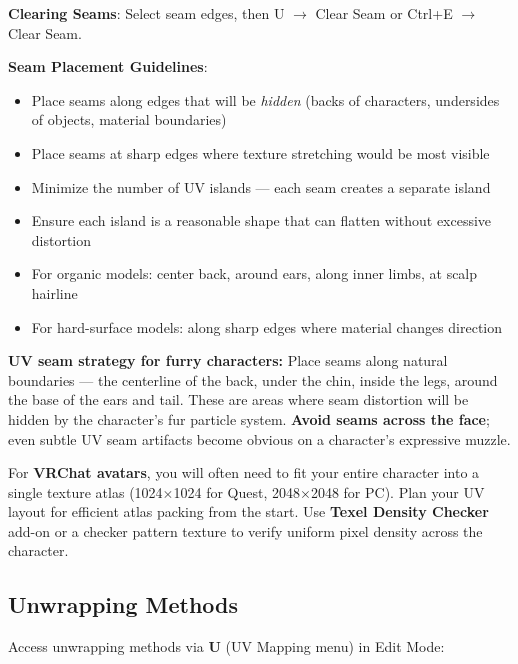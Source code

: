 \textbf{Clearing Seams}: Select seam edges, then U $\rightarrow$ Clear Seam or Ctrl+E $\rightarrow$ Clear Seam.

\textbf{Seam Placement Guidelines}:
\begin{itemize}[leftmargin=2em]
  \item Place seams along edges that will be \textit{hidden} (backs of characters, undersides of objects, material boundaries)
  \item Place seams at sharp edges where texture stretching would be most visible
  \item Minimize the number of UV islands --- each seam creates a separate island
  \item Ensure each island is a reasonable shape that can flatten without excessive distortion
  \item For organic models: center back, around ears, along inner limbs, at scalp hairline
  \item For hard-surface models: along sharp edges where material changes direction
\end{itemize}

\begin{furrybox}
\textbf{UV seam strategy for furry characters:} Place seams along natural boundaries --- the centerline of the back, under the chin, inside the legs, around the base of the ears and tail. These are areas where seam distortion will be hidden by the character's fur particle system. \textbf{Avoid seams across the face}; even subtle UV seam artifacts become obvious on a character's expressive muzzle.

For \textbf{VRChat avatars}, you will often need to fit your entire character into a single texture atlas (1024$\times$1024 for Quest, 2048$\times$2048 for PC). Plan your UV layout for efficient atlas packing from the start. Use \textbf{Texel Density Checker} add-on or a checker pattern texture to verify uniform pixel density across the character.
\end{furrybox}

\subsection{Unwrapping Methods}
\label{sec:unwrapmethods}

Access unwrapping methods via \textbf{U} (UV Mapping menu) in Edit Mode:

